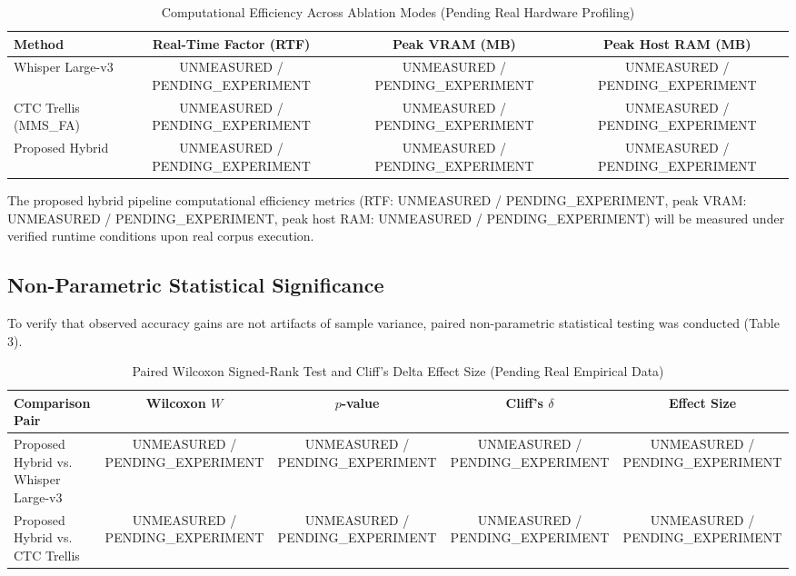 \documentclass[12pt,a4paper]{article}
\begin{document}
\begin{table}[t]
\centering
\caption{Computational Efficiency Across Ablation Modes (Pending Real Hardware Profiling)}
\label{tab:computational_performance}
\begin{tabular}{lccc}
\toprule
Method & Real-Time Factor (RTF) & Peak VRAM (MB) & Peak Host RAM (MB) \\
\midrule
Whisper Large-v3 & UNMEASURED / PENDING\_EXPERIMENT & UNMEASURED / PENDING\_EXPERIMENT & UNMEASURED / PENDING\_EXPERIMENT \\
CTC Trellis (MMS\_FA) & UNMEASURED / PENDING\_EXPERIMENT & UNMEASURED / PENDING\_EXPERIMENT & UNMEASURED / PENDING\_EXPERIMENT \\
Proposed Hybrid & UNMEASURED / PENDING\_EXPERIMENT & UNMEASURED / PENDING\_EXPERIMENT & UNMEASURED / PENDING\_EXPERIMENT \\
\bottomrule
\end{tabular}
\end{table}

The proposed hybrid pipeline computational efficiency metrics (RTF: UNMEASURED / PENDING\_EXPERIMENT, peak VRAM: UNMEASURED / PENDING\_EXPERIMENT, peak host RAM: UNMEASURED / PENDING\_EXPERIMENT) will be measured under verified runtime conditions upon real corpus execution.

\subsection{Non-Parametric Statistical Significance}
To verify that observed accuracy gains are not artifacts of sample variance, paired non-parametric statistical testing was conducted (Table 3).

\begin{table}[t]
\centering
\caption{Paired Wilcoxon Signed-Rank Test and Cliff's Delta Effect Size (Pending Real Empirical Data)}
\label{tab:statistical_significance}
\begin{tabular}{lcccc}
\toprule
Comparison Pair & Wilcoxon \(W\) & \(p\)-value & Cliff's \(\delta\) & Effect Size \\
\midrule
Proposed Hybrid vs. Whisper Large-v3 & UNMEASURED / PENDING\_EXPERIMENT & UNMEASURED / PENDING\_EXPERIMENT & UNMEASURED / PENDING\_EXPERIMENT & UNMEASURED / PENDING\_EXPERIMENT \\
Proposed Hybrid vs. CTC Trellis & UNMEASURED / PENDING\_EXPERIMENT & UNMEASURED / PENDING\_EXPERIMENT & UNMEASURED / PENDING\_EXPERIMENT & UNMEASURED / PENDING\_EXPERIMENT \\
\bottomrule
\end{tabular}
\end{table}
\end{document}
